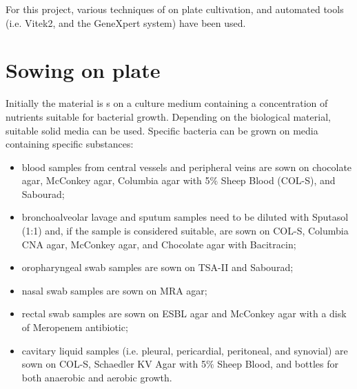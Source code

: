\documentclass[11pt]{report}
\begin{document}
For this project, various techniques of on plate cultivation, and automated tools (i.e. Vitek2, and the GeneXpert system) have been used.

\section{Sowing on plate}
Initially the material is s on a culture medium containing a concentration of nutrients suitable for bacterial growth.
Depending on the biological material, suitable solid media can be used. 
Specific bacteria can be grown on media containing specific substances:
\begin{itemize}
\item blood samples from central vessels and peripheral veins are sown on chocolate agar, McConkey agar, Columbia agar with 5$\%$ Sheep Blood (COL-S), and Sabourad;
\item bronchoalveolar lavage and sputum samples need to be diluted with Sputasol (1:1) and, if the sample is considered suitable, are sown on COL-S, Columbia CNA agar, McConkey agar, and Chocolate agar with Bacitracin;
\item oropharyngeal swab samples are sown on TSA-II and Sabourad;
\item nasal swab samples are sown on MRA agar;
\item rectal swab samples are sown on ESBL agar and McConkey agar with a disk of Meropenem antibiotic;
\item cavitary liquid samples (i.e. pleural, pericardial, peritoneal, and synovial) are sown on COL-S, Schaedler KV Agar with 5$\%$ Sheep Blood, and bottles for both anaerobic and aerobic growth.
\end{itemize}
\end{document}
